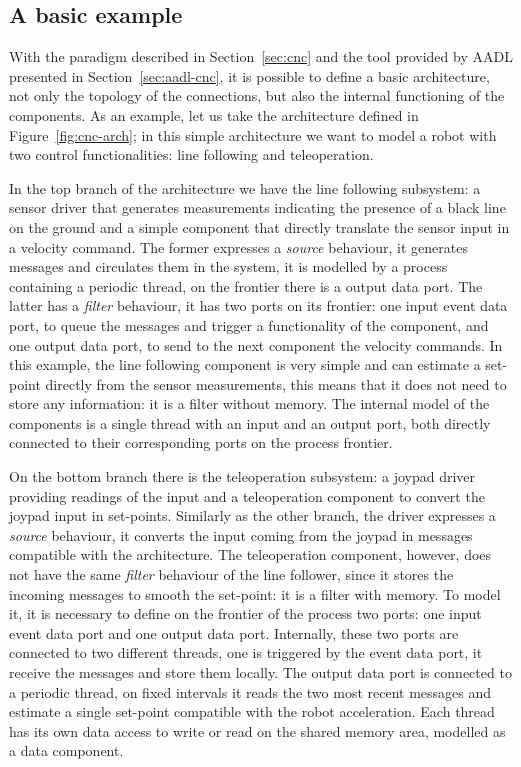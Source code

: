 \subsection{A basic example}
\label{sec:cnc-basic}
With the paradigm described in Section~\ref{sec:cnc} and the tool provided by AADL presented in Section~\ref{sec:aadl-cnc}, it is possible to define a basic architecture, not only the topology of the connections, but also the internal functioning of the components. As an example, let us take the architecture defined in Figure~\ref{fig:cnc-arch}; in this simple architecture we want to model a robot with two control functionalities: line following and teleoperation.

In the top branch of the architecture we have the line following subsystem: a sensor driver that generates measurements indicating the presence of a black line on the ground and a simple component that directly translate the sensor input in a velocity command. The former expresses a \textit{source} behaviour, it generates messages and circulates them in the system, it is modelled by a process containing a periodic thread, on the frontier there is a output data port. The latter has a \textit{filter} behaviour, it has two ports on its frontier: one input event data port, to queue the messages and trigger a functionality of the component, and one output data port, to send to the next component the velocity commands. In this example, the line following component is very simple and can estimate a set-point directly from the sensor measurements, this means that it does not need to store any information: it is a filter without memory. The internal model of the components is a single thread with an input and an output port, both directly connected to their corresponding ports on the process frontier.

On the bottom branch there is the teleoperation subsystem: a joypad driver providing readings of the input and a teleoperation component to convert the joypad input in set-points. Similarly as the other branch, the driver expresses a \textit{source} behaviour, it converts the input coming from the joypad in messages compatible with the architecture. The teleoperation component, however, does not have the same \textit{filter} behaviour of the line follower, since it stores the incoming messages to smooth the set-point: it is a filter with memory. To model it, it is necessary to define on the frontier of the process two ports: one input event data port and one output data port. Internally, these two ports are connected to two different threads, one is triggered by the event data port, it receive the messages and store them locally. The output data port is connected to a periodic thread, on fixed intervals it reads the two most recent messages and estimate a single set-point compatible with the robot acceleration. Each thread has its own data access to write or read on the shared memory area, modelled as a data component.

